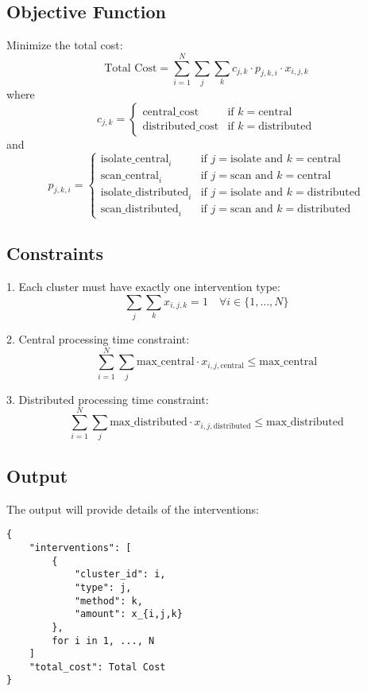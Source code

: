 \documentclass{article}
\begin{document}
\subsection*{Objective Function}
Minimize the total cost:
\[
\text{Total Cost} = \sum_{i=1}^{N} \sum_{j} \sum_{k} c_{j,k} \cdot p_{j,k,i} \cdot x_{i,j,k}
\]
where
\[
c_{j,k} = 
\begin{cases} 
\text{central\_cost} & \text{if } k = \text{central} \\ 
\text{distributed\_cost} & \text{if } k = \text{distributed}
\end{cases}
\]
and
\[
p_{j,k,i} = 
\begin{cases} 
\text{isolate\_central}_{i} & \text{if } j = \text{isolate} \text{ and } k = \text{central} \\ 
\text{scan\_central}_{i} & \text{if } j = \text{scan} \text{ and } k = \text{central} \\ 
\text{isolate\_distributed}_{i} & \text{if } j = \text{isolate} \text{ and } k = \text{distributed} \\ 
\text{scan\_distributed}_{i} & \text{if } j = \text{scan} \text{ and } k = \text{distributed}
\end{cases}
\]

\subsection*{Constraints}
1. Each cluster must have exactly one intervention type:
\[
\sum_{j} \sum_{k} x_{i,j,k} = 1 \quad \forall i \in \{1, \dots, N\}
\]

2. Central processing time constraint:
\[
\sum_{i=1}^{N} \sum_{j} \text{max\_central} \cdot x_{i,j,\text{central}} \leq \text{max\_central}
\]

3. Distributed processing time constraint:
\[
\sum_{i=1}^{N} \sum_{j} \text{max\_distributed} \cdot x_{i,j,\text{distributed}} \leq \text{max\_distributed}
\]

\subsection*{Output}
The output will provide details of the interventions:
\begin{verbatim}
{
    "interventions": [
        {
            "cluster_id": i,
            "type": j,
            "method": k,
            "amount": x_{i,j,k}
        },
        for i in 1, ..., N
    ]
    "total_cost": Total Cost
}
\end{verbatim}
\end{document}

